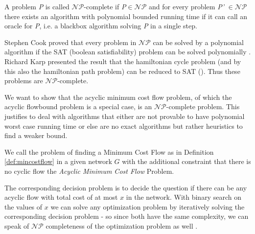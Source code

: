 \begin{definition}
 A problem \textit{P} is called $\mathcal{NP}$-complete if \textit{P}$\in\mathcal{NP}$ and for every problem 
\textit{P'} $\in \mathcal{NP}$ there exists an algorithm with polynomial bounded running time if it can call an 
oracle for \textit{P}, i.e. a blackbox algorithm solving \textit{P} in a single step.
\end{definition}

Stephen Cook proved that every problem in $\mathcal{NP}$ can be solved by a polynomial algorithm if the SAT (boolean 
satisfiability) problem can be solved polynomially \cite{Cook:1971:CTP:800157.805047}. 
Richard Karp presented the result that the hamiltonian cycle problem (and by this also the hamiltonian path problem) 
can be reduced to SAT (\cite{Karp1972}). Thus these problems are $\mathcal{NP}$-complete.

We want to show that the acyclic minimum cost flow problem, of which the acyclic flowbound problem is a special case, 
is an $\mathcal{NP}$-complete problem. This justifies to deal with algorithms that either are not provable to have 
polynomial worst case running time or else are no exact algorithms but rather heuristics to find a weaker bound.



\begin{definition}
 We call the problem of finding a Minimum Cost Flow as in Definition \ref{def:mincostflow} in a given 
network $G$ with the additional constraint  that there is no cyclic flow the \textit{Acyclic Minimum Cost Flow} 
Problem. 

The corresponding decision problem is to decide the question if there can be any acyclic flow with total cost of at 
most $x$ in the network. With binary search on the values of $x$ we can solve any optimization problem by iteratively 
solving the corresponding decision problem - so since both have the same complexity, we can speak of $\mathcal{NP}$ 
completeness of the optimization problem as well . 
\end{definition}

